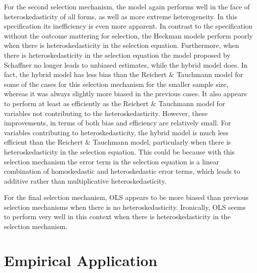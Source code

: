 \documentclass{article}
\begin{document}
For the second selection mechanism, the \citet{reichert2014} model again performs well in the face of heteroskedasticity of all forms, as well as more extreme heterogeneity.  In this specification its inefficiency is even more apparent.  In contrast to the specification without the outcome mattering for selection, the Heckman models perform poorly when there is heteroskedasticity in the selection equation.  Furthermore, when there is heteroskedasticity in the selection equation the model proposed by Schaffner no longer leads to unbiased estimates, while the hybrid model does. In fact, the hybrid model has less bias than the Reichert \& Tauchmann model for some of the cases for this selection mechanism for the smaller sample size, whereas it was always slightly more biased in the previous cases.  It also appears to perform at least as efficiently as the Reichert \& Tauchmann model for variables not contributing to the heteroskedasticity.  However, these improvements, in terms of both bias and efficiency are relatively small.  For variables contributing to heteroskedasticity, the hybrid model is much less efficient than the Reichert \& Tauchmann model, particularly when there is heteroskedasticity in the selection equation.  This could be because with this selection mechanism the error term in the selection equation is a linear combination of homoskedastic and heteroskedastic error terms, which leads to additive rather than multiplicative heteroskedasticity.

\begin{table}[htbp]


\end{table}

\begin{table}[htbp]


\end{table}

For the final selection mechanism, OLS appears to be more biased than previous selection mechanisms when there is no heteroskedasticity.  Ironically, OLS seems to perform very well in this context when there is heteroskedasticity in the selection mechanism.

\begin{table}[htbp]


\end{table}



\section{Empirical Application}
\end{document}
